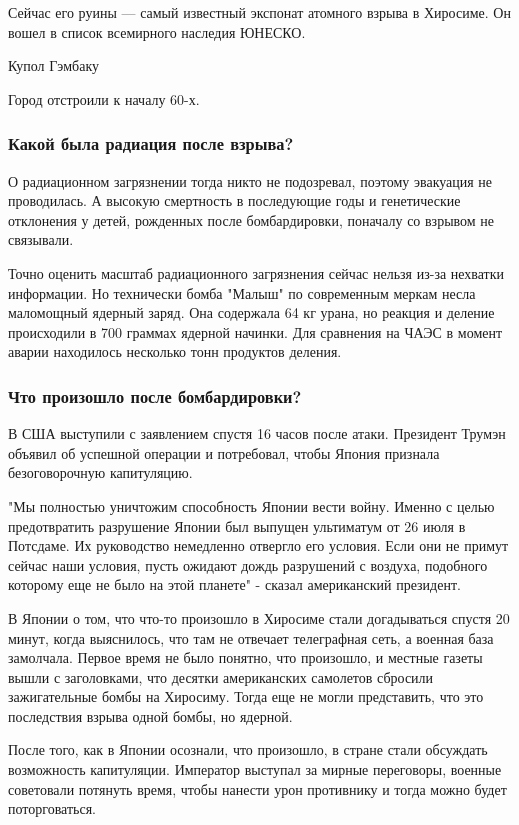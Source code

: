 \documentclass[a4paper,11pt]{extreport}
\begin{document}
Сейчас его руины --- самый известный экспонат атомного взрыва в Хиросиме. Он
вошел в список всемирного наследия ЮНЕСКО.

Купол Гэмбаку

Город отстроили к началу 60-х.

\subsubsection{Какой была радиация после взрыва?}

О радиационном загрязнении тогда никто не подозревал, поэтому эвакуация не
проводилась. А высокую смертность в последующие годы и генетические отклонения
у детей, рожденных после бомбардировки, поначалу со взрывом не связывали.

Точно оценить масштаб радиационного загрязнения сейчас нельзя из-за нехватки
информации. Но технически бомба "Малыш" по современным меркам несла маломощный
ядерный заряд. Она содержала 64 кг урана, но реакция и деление происходили в
700 граммах ядерной начинки. Для сравнения на ЧАЭС в момент аварии находилось
несколько тонн продуктов деления.

\subsubsection{Что произошло после бомбардировки?}

В США выступили с заявлением спустя 16 часов после атаки. Президент Трумэн объявил об успешной операции и потребовал, чтобы Япония признала безоговорочную капитуляцию.

"Мы полностью уничтожим способность Японии вести войну. Именно с целью предотвратить разрушение Японии был выпущен ультиматум от 26 июля в Потсдаме. Их руководство немедленно отвергло его условия. Если они не примут сейчас наши условия, пусть ожидают дождь разрушений с воздуха, подобного которому еще не было на этой планете" - сказал американский президент.

В Японии о том, что что-то произошло в Хиросиме стали догадываться спустя 20 минут, когда выяснилось, что там не отвечает телеграфная сеть, а военная база замолчала. Первое время не было понятно, что произошло, и местные газеты вышли с заголовками, что десятки американских самолетов сбросили зажигательные бомбы на Хиросиму. Тогда еще не могли представить, что это последствия взрыва одной бомбы, но ядерной.

После того, как в Японии осознали, что произошло, в стране стали обсуждать возможность  капитуляции. Император выступал за мирные переговоры, военные советовали потянуть время, чтобы нанести урон противнику и тогда можно будет поторговаться. 
\end{document}

